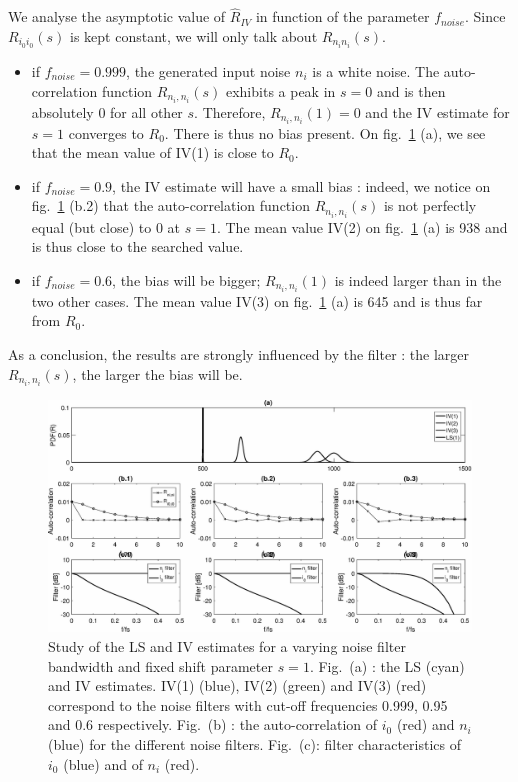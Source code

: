 We analyse the asymptotic value of $\hat{R}_{IV}$ in function of the parameter $f_{noise}$. Since $R_{i_0 i_0}(s)$ is kept constant, we will only talk about $R_{n_i n_i}(s)$.
\begin{itemize}
    \item if $f_{noise} = 0.999$, the generated input noise $n_i$ is a white noise. The auto-correlation function $R_{n_i,n_i}(s)$ exhibits a peak in $s = 0$ and is then absolutely 0 for all other $s$. Therefore, $R_{n_i,n_i}(1) = 0$ and the IV estimate for $s = 1$ converges to $R_0$. There is thus no bias present. On fig.~\ref{Sess1_part1_exp1} (a), we see that the mean value of IV(1) is close to $R_0$.
    \item if $f_{noise} = 0.9$, the IV estimate will have a small bias : indeed, we notice on fig.~\ref{Sess1_part1_exp1} (b.2) that the auto-correlation function $R_{n_i,n_i}(s)$ is not perfectly equal (but close) to 0 at $s=1$. The mean value IV(2) on fig.~\ref{Sess1_part1_exp1} (a) is 938 and is thus close to the searched value.
    \item if $f_{noise} = 0.6$, the bias will be bigger; $R_{n_i,n_i}(1)$ is indeed larger than in the two other cases. The mean value IV(3) on fig.~\ref{Sess1_part1_exp1} (a) is 645 and is thus far from $R_0$.
\end{itemize}

As a conclusion, the results are strongly influenced by the filter : the larger $R_{n_i,n_i}(s)$, the larger the bias will be.
\begin{figure}[h!]
    \centering
    \includegraphics[width=1\textwidth]{figures/Sess1_part1_exp1.eps}
    \caption{Study of the LS and IV estimates for a varying noise filter bandwidth and fixed shift parameter $s = 1$. Fig.~(a) : the LS (cyan) and IV estimates. IV(1) (blue), IV(2) (green) and IV(3) (red) correspond to the noise filters with cut-off frequencies 0.999, 0.95 and 0.6 respectively. Fig.~(b) : the auto-correlation of $i_0$ (red) and $n_i$ (blue) for the different noise filters. Fig.~(c): filter characteristics of $i_0$ (blue) and of $n_i$ (red).}
    \label{Sess1_part1_exp1}
\end{figure}

